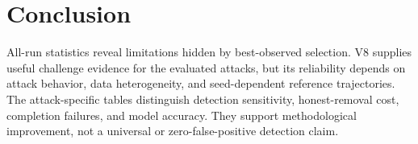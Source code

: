 \documentclass[conference]{IEEEtran}
\begin{document}
\section{Conclusion}
All-run statistics reveal limitations hidden by best-observed selection. V8 supplies useful challenge evidence for the evaluated attacks, but its reliability depends on attack behavior, data heterogeneity, and seed-dependent reference trajectories. The attack-specific tables distinguish detection sensitivity, honest-removal cost, completion failures, and model accuracy. They support methodological improvement, not a universal or zero-false-positive detection claim.


\end{document}
